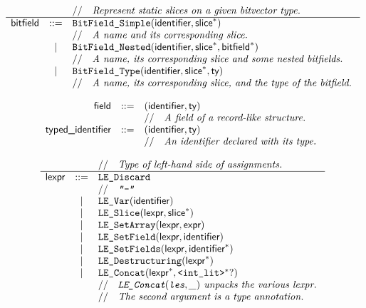 \documentclass{book}
\begin{document}
\[
\begin{array}{rcl}
& & //\quad\textit{Represent static slices on a given bitvector type.}\ \\
\hline
\textsf{bitfield} &::=& \texttt{BitField\_Simple}(\textsf{identifier}, \textsf{slice}^{*}) \\
  & & //\quad\textit{A name and its corresponding slice.}\ \\
  &|& \texttt{BitField\_Nested}(\textsf{identifier}, \textsf{slice}^{*}, \textsf{bitfield}^{*}) \\
  & & //\quad\textit{A name, its corresponding slice and some nested bitfields.}\ \\
  &|& \texttt{BitField\_Type}(\textsf{identifier}, \textsf{slice}^{*}, \textsf{ty}) \\
  & & //\quad\textit{A name, its corresponding slice, and the type of the bitfield.}\ \\
\end{array}
\]

\[
\begin{array}{rcl}
\textsf{field} &::=& (\textsf{identifier}, \textsf{ty})\\
  & & //\quad\textit{A field of a record-like structure.}\ \\
\textsf{typed\_identifier} &::=& (\textsf{identifier}, \textsf{ty})\\
  & & //\quad\textit{An identifier declared with its type.}\ \\
\end{array}
\]

\[
\begin{array}{rcl}
& & //\quad\textit{Type of left-hand side of assignments.}\ \\
\hline
\textsf{lexpr} &::=& \texttt{LE\_Discard}\\
  & & //\quad\textit{\texttt{"-"}}\ \\
  &|& \texttt{LE\_Var}(\textsf{identifier})\\
  &|& \texttt{LE\_Slice}(\textsf{lexpr}, \textsf{slice}^*)\\
  &|& \texttt{LE\_SetArray}(\textsf{lexpr}, \textsf{expr})\\
  &|& \texttt{LE\_SetField}(\textsf{lexpr}, \textsf{identifier})\\
  &|& \texttt{LE\_SetFields}(\textsf{lexpr}, \textsf{identifier}^*)\\
  &|& \texttt{LE\_Destructuring}(\textsf{lexpr}^*)\\
  &|& \texttt{LE\_Concat}(\textsf{lexpr}^*, \texttt{<int\_lit>}^*?)\\
  & & //\quad\textit{\texttt{LE\_Concat}$(\texttt{les}, \_)$ unpacks the various lexpr.}\ \\
  & & //\quad\textit{The second argument is a type annotation.}\ \\
\end{array}
\]
\end{document}
